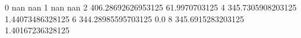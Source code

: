 0 nan nan
1 nan nan
2 406.28692626953125 61.9970703125
4 345.7305908203125 1.44073486328125
6 344.28985595703125 0.0
8 345.6915283203125 1.40167236328125
